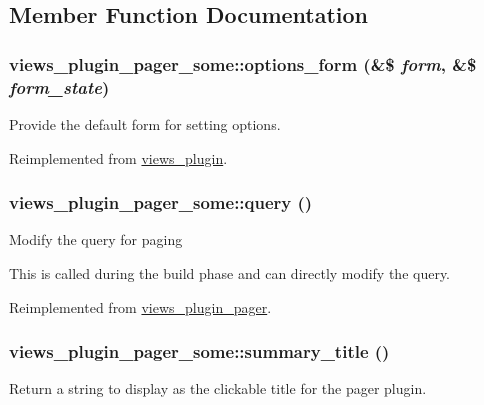 \subsection{Member Function Documentation}
\hypertarget{classviews__plugin__pager__some_a805f4c0f574ed78f4e3c8451d76a6eb9}{
\subsubsection[{options\_\-form}]{\setlength{\rightskip}{0pt plus 5cm}views\_\-plugin\_\-pager\_\-some::options\_\-form (\&\$ {\em form}, \/  \&\$ {\em form\_\-state})}}
\label{classviews__plugin__pager__some_a805f4c0f574ed78f4e3c8451d76a6eb9}
Provide the default form for setting options. 

Reimplemented from \hyperlink{classviews__plugin_a1aaed8da1afd9f45293a37358c159837}{views\_\-plugin}.\hypertarget{classviews__plugin__pager__some_a47c807d686e60481be1e6289e3672860}{
\subsubsection[{query}]{\setlength{\rightskip}{0pt plus 5cm}views\_\-plugin\_\-pager\_\-some::query ()}}
\label{classviews__plugin__pager__some_a47c807d686e60481be1e6289e3672860}
Modify the query for paging

This is called during the build phase and can directly modify the query. 

Reimplemented from \hyperlink{classviews__plugin__pager_a6b9aad7e28125013cbf7a15c19e78d47}{views\_\-plugin\_\-pager}.\hypertarget{classviews__plugin__pager__some_a2effa2f5a44d1a73a0b53653658d6ed6}{
\subsubsection[{summary\_\-title}]{\setlength{\rightskip}{0pt plus 5cm}views\_\-plugin\_\-pager\_\-some::summary\_\-title ()}}
\label{classviews__plugin__pager__some_a2effa2f5a44d1a73a0b53653658d6ed6}
Return a string to display as the clickable title for the pager plugin. 

